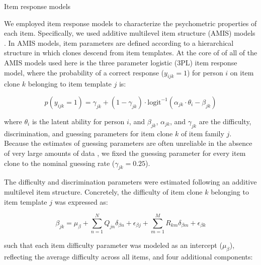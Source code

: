 \documentclass[a4paper,man,natbib]{apa6}
\makeatletter
\renewcommand{\subsubsection}{\@startsection{subsubsection}{3}
  {\z@}%
  {\b@level@two@skip}{\e@level@two@skip}%
  {\normalfont\normalsize\bfseries}}
\makeatother
\begin{document}
\subsubsection{Item response models}

We employed item response models to characterize the psychometric properties of each item. Specifically, we used additive multilevel item structure (AMIS) models \citep{geerlings2011modeling, cho2014additive, lathrop2017item}. In AMIS models, item parameters are defined according to a hierarchical structure in which clones descend from item templates. At the core of of all of the AMIS models used here is the three parameter logistic (3PL) item response model, where the probability of a correct response ($y_{ijk} = 1$) for person $i$ on item clone $k$ belonging to item template $j$ is:

\begin{equation} \label{eq:1}
p(y_{ijk} = 1) = \gamma_{jk} + (1-\gamma_{jk}) \cdot \text{logit}^{-1} \left( \alpha_{jk} \cdot \theta_i - \beta_{jk} \right)
\end{equation}

\noindent where $\theta_i$ is the latent ability for person $i$, and $\beta_{jk}$, $\alpha_{jk}$, and $\gamma_{jk}$ are the difficulty, discrimination, and guessing parameters for item clone $k$ of item family $j$. Because the estimates of guessing parameters are often unreliable in the absence of very large amounts of data \citep{han2012fixing}, we fixed the guessing parameter for every item clone to the nominal guessing rate ($\gamma_{jk} = 0.25$).

The difficulty and discrimination parameters were estimated following an additive multilevel item structure. Concretely, the difficulty of item clone $k$ belonging to item template $j$ was expressed as:  

\begin{equation}
\beta_{jk} = \mu_\beta + \sum_{n=1}^N Q_{jn} \delta_{\beta n} + \epsilon_{\beta j} + \sum_{m=1}^M R_{km} \delta_{\beta m} + \epsilon_{\beta k}
\end{equation}

\noindent such that each item difficulty parameter was modeled as an intercept ($\mu_\beta$), reflecting the average difficulty across all items, and four additional components:
\end{document}
